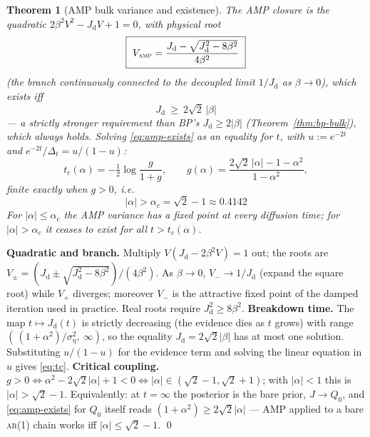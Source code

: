 \documentclass[11pt]{article}
\newtheorem{theorem}[proposition]{Theorem}
\theoremstyle{definition}
\newcommand{\Dt}{\Delta_t}
\newcommand{\Jd}{J_{\mathrm d}}
\begin{document}
\begin{theorem}[AMP bulk variance and existence]\label{thm:amp-bulk}
The AMP closure is the quadratic $2\beta^2V^2-\Jd V+1=0$, with physical root
\begin{equation}\label{eq:amp-fixed}
  \boxed{\ V_{\textsc{amp}}
  =\frac{\Jd-\sqrt{\Jd^2-8\beta^2}}{4\beta^2}\ }
\end{equation}
(the branch continuously connected to the decoupled limit $1/\Jd$ as
$\beta\to0$), which exists \emph{iff}
\begin{equation}\label{eq:amp-exists}
  \boxed{\ \Jd\ \ge\ 2\sqrt2\,|\beta|\ }
\end{equation}
--- a strictly stronger requirement than BP's $\Jd\ge2|\beta|$
(Theorem~\ref{thm:bp-bulk}), which always holds. Solving
\eqref{eq:amp-exists} as an equality for $t$, with
$u:=e^{-2t}$ and $e^{-2t}/\Dt=u/(1-u)$:
\begin{equation}\label{eq:tc}
  t_c(\alpha)=-\tfrac12\log\frac{g}{1+g},\qquad
  g(\alpha)=\frac{2\sqrt2\,|\alpha|-1-\alpha^2}{1-\alpha^2},
\end{equation}
finite exactly when $g>0$, i.e.\
\begin{equation}\label{eq:alphac}
  \boxed{\ |\alpha|>\alpha_c=\sqrt2-1\approx0.4142\ }
\end{equation}
For $|\alpha|\le\alpha_c$ the AMP variance has a fixed point at \emph{every}
diffusion time; for $|\alpha|>\alpha_c$ it ceases to exist for all
$t>t_c(\alpha)$.
\end{theorem}

\begin{derivation}[\ref*{thm:amp-bulk}]
\textbf{Quadratic and branch.} Multiply $V(\Jd-2\beta^2V)=1$ out; the roots
are $V_\pm=(\Jd\pm\sqrt{\Jd^2-8\beta^2})/(4\beta^2)$. As $\beta\to0$,
$V_-\to1/\Jd$ (expand the square root) while $V_+$ diverges; moreover $V_-$ is
the attractive fixed point of the damped iteration used in practice. Real
roots require $\Jd^2\ge8\beta^2$. \textbf{Breakdown time.} The map
$t\mapsto\Jd(t)$ is strictly decreasing (the evidence dies as $t$ grows) with
range $(\,(1{+}\alpha^2)/\sigma_\eta^2,\ \infty)$, so the equality
$\Jd=2\sqrt2|\beta|$ has at most one solution. Substituting $u/(1-u)$ for the
evidence term and solving the linear equation in $u$ gives \eqref{eq:tc}.
\textbf{Critical coupling.} $g>0\iff\alpha^2-2\sqrt2|\alpha|+1<0
\iff|\alpha|\in(\sqrt2-1,\sqrt2+1)$; with $|\alpha|<1$ this is
$|\alpha|>\sqrt2-1$. Equivalently: at $t=\infty$ the posterior is the bare
prior, $J\to Q_0$, and \eqref{eq:amp-exists} for $Q_0$ itself reads
$(1+\alpha^2)\ge2\sqrt2|\alpha|$ --- AMP applied to a bare \textsc{ar}(1)
chain works iff $|\alpha|\le\sqrt2-1$. \qed
\end{derivation}
\end{document}
